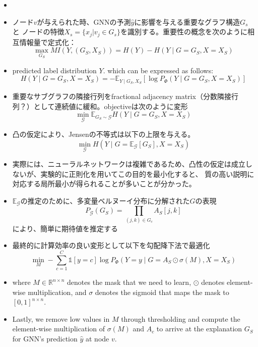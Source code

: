 \documentclass[a4paper,10pt]{ltjsarticle}
\newcommand{\1}{\mbox{1}\hspace{-0.25em}\mbox{l}}
\theoremstyle{definition}
\begin{document}
    \begin{itemize}
        \item \item ノード$v$が与えられた時、GNNの予測$\hat{y}$に影響を与える重要なグラフ構造$G_s$と
        ノードの特徴$X_s=\{x_j | v_j \in G_s\}$を識別する。重要性の概念を次のように相互情報量で定式化：
        \begin{equation}
            \max _{G_{S}} M I\left(Y,\left(G_{S}, X_{S}\right)\right)=H(Y)-H\left(Y \mid G=G_{S}, X=X_{S}\right)
        \end{equation}
        \item predicted label distribution $Y$. which can be expressed as follows:
        \begin{equation}
            H\left(Y \mid G=G_{S}, X=X_{S}\right)=-\mathbb{E}_{Y \mid G_{S}, X_{S}}\left[\log P_{\Phi}\left(Y \mid G=G_{S}, X=X_{S}\right)\right]
        \end{equation}
        \item 重要なサブグラフの隣接行列をfractional adjacency matrix（分数隣接行列？）として連続値に緩和。objectiveは次のように変形
        \begin{equation}
            \min _{\mathcal{G}} \mathbb{E}_{G_{S} \sim \mathcal{G}} H\left(Y \mid G=G_{S}, X=X_{S}\right)
        \end{equation}
        \item 凸の仮定により、Jensenの不等式は以下の上限を与える。
        \begin{equation}
            \min _{\mathcal{G}} H\left(Y \mid G=\mathbb{E}_{\mathcal{G}}\left[G_{S}\right], X=X_{S}\right)
        \end{equation}
        \item 実際には、ニューラルネットワークは複雑であるため、凸性の仮定は成立しないが、実験的に正則化を用いてこの目的を最小化すると、
        質の高い説明に対応する局所最小が得られることが多いことが分かった。
        \item $\mathbb{E}_{\mathcal{G}}$の推定のために、多変量ベルヌーイ分布に分解された$G$の表現
        \begin{equation}
            P_{\mathcal{G}}\left(G_{S}\right)=\prod_{(j, k) \in G_{c}} A_{S}[j, k]
        \end{equation}
        により、簡単に期待値を推定する
        \item 最終的に計算効率の良い変形として以下を勾配降下法で最適化
        \begin{equation}
            \min _{M}-\sum_{c=1}^{C} \mathbb{1}[y=c] \log P_{\Phi}\left(Y=y \mid G=A_{S} \odot \sigma(M), X=X_{S}\right)
        \end{equation}
        \item where $M \in \mathbb{R}^{n \times n}$ denotes the mask that we need to learn,
        $\odot$ denotes element-wise multiplication, and $\sigma$ denotes the sigmoid that maps the mask to $[0,1]^{n \times n}$.
        \item Lastly, we remove low values in $M$ through thresholding and compute the element-wise multiplication of $\sigma(M)$ and $A_{c}$ to arrive at the explanation $G_{S}$ for GNN's prediction $\hat{y}$ at node $v$.
    \end{itemize}
\end{document}
